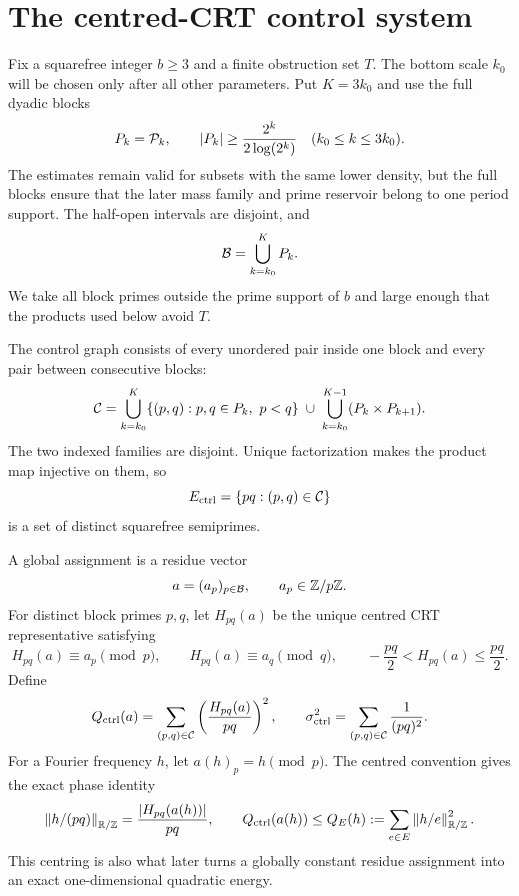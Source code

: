 \section{The centred-CRT control system}\label{sec:control}

Fix a squarefree integer $b\ge3$ and a finite obstruction set $T$.  The bottom
scale $k_0$ will be chosen only after all other parameters.  Put $K=3k_0$ and
use the full dyadic blocks
\[
 P_k=\mathcal P_k,
 \qquad
 |P_k|\ge\frac{2^k}{2\log(2^k)}
 \quad(k_0\le k\le3k_0).
\]
The estimates remain valid for subsets with the same lower density, but the
full blocks ensure that the later mass family and prime reservoir belong to one
period support.  The half-open intervals are disjoint, and
\[
 \mathcal B=\bigcup_{k=k_0}^{K}P_k.
\]
We take all block primes outside the prime support of $b$ and large enough that
the products used below avoid $T$.

The control graph consists of every unordered pair inside one block and every
pair between consecutive blocks:
\begin{equation}\label{eq:control-graph}
 \mathcal C=
 \bigcup_{k=k_0}^{K}\{(p,q):p,q\in P_k,\ p<q\}
 \;\cup\;
 \bigcup_{k=k_0}^{K-1}(P_k\times P_{k+1}).
\end{equation}
The two indexed families are disjoint.  Unique factorization makes the product
map injective on them, so
\[
 E_{\mathrm{ctrl}}=\{pq:(p,q)\in\mathcal C\}
\]
is a set of distinct squarefree semiprimes.

A global assignment is a residue vector
\[
 a=(a_p)_{p\in\mathcal B},
 \qquad a_p\in\mathbb Z/p\mathbb Z.
\]
For distinct block primes $p,q$, let $H_{pq}(a)$ be the unique centred CRT
representative satisfying
\begin{equation}\label{eq:centered-crt}
 H_{pq}(a)\equiv a_p\pmod p,
 \qquad
 H_{pq}(a)\equiv a_q\pmod q,
 \qquad
 -\frac{pq}{2}<H_{pq}(a)\le\frac{pq}{2}.
\end{equation}
Define
\begin{equation}\label{eq:Qctrl}
 Q_{\mathrm{ctrl}}(a)=\sum_{(p,q)\in\mathcal C}
 \left(\frac{H_{pq}(a)}{pq}\right)^2,
 \qquad
 \sigma_{\mathrm{ctrl}}^2=\sum_{(p,q)\in\mathcal C}\frac1{(pq)^2}.
\end{equation}
For a Fourier frequency $h$, let $a(h)_p=h\pmod p$.  The centred convention gives
the exact phase identity
\begin{equation}\label{eq:control-energy-identity}
 \left\lVert h/(pq)\right\rVert_{\mathbb R/\mathbb Z}=\frac{|H_{pq}(a(h))|}{pq},
 \qquad
 Q_{\mathrm{ctrl}}(a(h))\le Q_E(h):=\sum_{e\in E}\left\lVert h/e\right\rVert_{\mathbb R/\mathbb Z}^2.
\end{equation}
This centring is also what later turns a globally constant residue assignment
into an exact one-dimensional quadratic energy.

